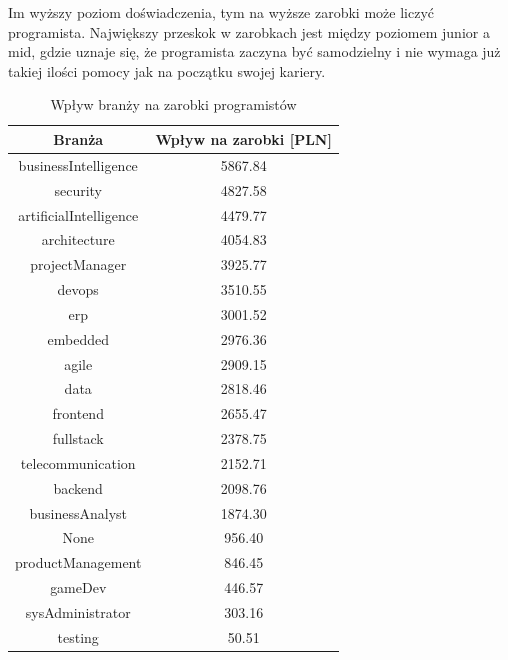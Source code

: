 \documentclass{article}
\begin{document}
Im wyższy poziom doświadczenia, tym na wyższe zarobki może liczyć programista.
Największy przeskok w zarobkach jest między poziomem junior a mid, gdzie
uznaje się, że programista zaczyna być samodzielny i nie wymaga już takiej ilości pomocy
jak na początku swojej kariery.



\begin{table}[H]
    \centering
    \begin{tabular}{|c|c|}
        \hline
        \textbf{Branża}        & \textbf{Wpływ na zarobki [PLN]} \\ \hline
        businessIntelligence   & 5867.84                         \\ \hline
        security               & 4827.58                         \\ \hline
        artificialIntelligence & 4479.77                         \\ \hline
        architecture           & 4054.83                         \\ \hline
        projectManager         & 3925.77                         \\ \hline
        devops                 & 3510.55                         \\ \hline
        erp                    & 3001.52                         \\ \hline
        embedded               & 2976.36                         \\ \hline
        agile                  & 2909.15                         \\ \hline
        data                   & 2818.46                         \\ \hline
        frontend               & 2655.47                         \\ \hline
        fullstack              & 2378.75                         \\ \hline
        telecommunication      & 2152.71                         \\ \hline
        backend                & 2098.76                         \\ \hline
        businessAnalyst        & 1874.30                         \\ \hline
        None                   & 956.40                          \\ \hline
        productManagement      & 846.45                          \\ \hline
        gameDev                & 446.57                          \\ \hline
        sysAdministrator       & 303.16                          \\ \hline
        testing                & 50.51                           \\ \hline
    \end{tabular}
    \caption{Wpływ branży na zarobki programistów}
    \label{tab:industry}
\end{table}
\end{document}
